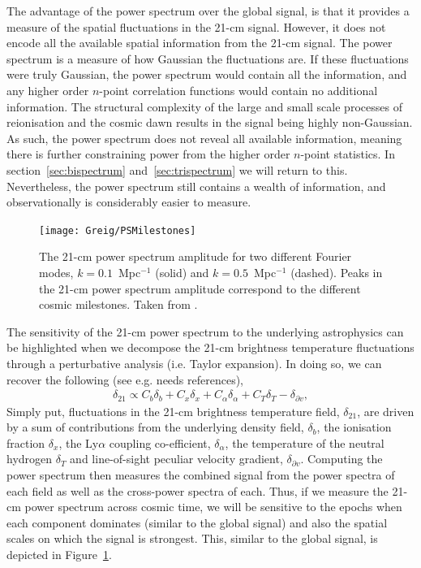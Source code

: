 The advantage of the power spectrum over the global signal, is that it provides a measure of the spatial fluctuations in the 21-cm signal. However, it does not encode all the available spatial information from the 21-cm signal. The power spectrum is a measure of how Gaussian the fluctuations are. If these fluctuations were truly Gaussian, the power spectrum would contain all the information, and any higher order $n$-point correlation functions would contain no additional information. The structural complexity of the large and small scale processes of reionisation and the cosmic dawn results in the signal being highly non-Gaussian. As such, the power spectrum does not reveal all available information, meaning there is further constraining power from the higher order $n$-point statistics. In section~\ref{sec:bispectrum} and~\ref{sec:trispectrum}  we will return to this. Nevertheless, the power spectrum still contains a wealth of information, and observationally is considerably easier to measure.

\begin{figure}[]
\begin{center}
\texttt{[image: Greig/PSMilestones]}
\end{center}
\caption{The 21-cm power spectrum amplitude for two different Fourier modes, $k=0.1$~Mpc$^{-1}$ (solid) and $k=0.5$~Mpc$^{-1}$ (dashed). Peaks in the 21-cm power spectrum amplitude correspond to the different cosmic milestones. Taken from \cite{Mesinger:2016}.}
\label{fig:PSMilestones}
\end{figure}

The sensitivity of the 21-cm power spectrum to the underlying astrophysics can be highlighted when we decompose the 21-cm brightness temperature fluctuations through a perturbative analysis (i.e. Taylor expansion). In doing so, we can recover the following (see e.g. {\color{red} needs references}),
\begin{eqnarray}
\delta_{21} \propto C_{b}\delta_{b} + C_{x}\delta_{x} + C_{\alpha}\delta_{\alpha} + C_{T}\delta_{T} - \delta_{\partial v},
\end{eqnarray}
Simply put, fluctuations in the 21-cm brightness temperature field, $\delta_{21}$, are driven by a sum of contributions from the underlying density field, $\delta_{b}$, the ionisation fraction $\delta_{x}$, the Ly$\alpha$ coupling co-efficient, $\delta_{\alpha}$, the temperature of the neutral hydrogen $\delta_{T}$ and line-of-sight peculiar velocity gradient, $\delta_{\partial v}$. Computing the power spectrum then measures the combined signal from the power spectra of each field as well as the cross-power spectra of each. Thus, if we measure the 21-cm power spectrum across cosmic time, we will be sensitive to the epochs when each component dominates (similar to the global signal) and also the spatial scales on which the signal is strongest. This, similar to the global signal, is depicted in Figure~\ref{fig:PSMilestones}.


